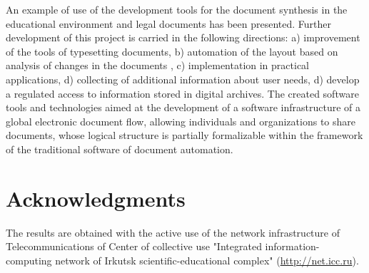 \documentclass[12pt]{llncs}
\begin{document}
An example of use of the development tools for the document synthesis in
the educational environment and legal documents has been presented.
Further development of this project is carried in the following
directions: a) improvement of the tools of typesetting documents, b)
automation of the layout based on analysis of changes in the documents
\cite{b2}, c) implementation in practical applications, d) collecting of
additional information about user needs, d) develop a regulated access
to information stored in digital archives. The created software tools
and technologies aimed at the development of a software infrastructure
of a global electronic document flow, allowing individuals and
organizations to share documents, whose logical structure is partially
formalizable within the framework of the traditional software of
document automation.

\section{Acknowledgments}

The results are obtained with the active use of the network
infrastructure of Telecommunications of Center of collective use
"Integrated information-computing network of Irkutsk
scientific-educational complex" (\url{http://net.icc.ru}).
\end{document}
